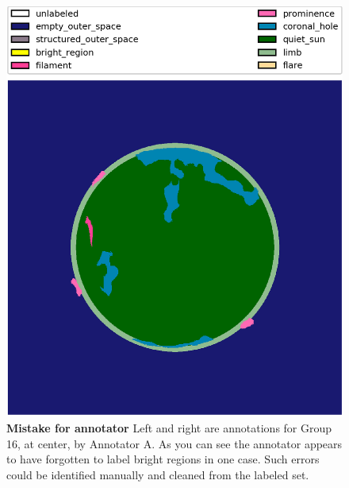 \documentclass[twoside]{report}
\begin{document}
\begin{figure}[H]
\begin{center}
    \includegraphics[scale=0.1]{g20171015000202-1}
    \caption{{\bf Mistake for annotator} Left and right are annotations for Group 16, at center, by Annotator A. As you can see the annotator appears to have forgotten to label bright regions in one case. Such errors could be identified manually and cleaned from the labeled set. } 
    \label{fig:annotatorconsistency}
 \end{center}
\end{figure}
\end{document}
